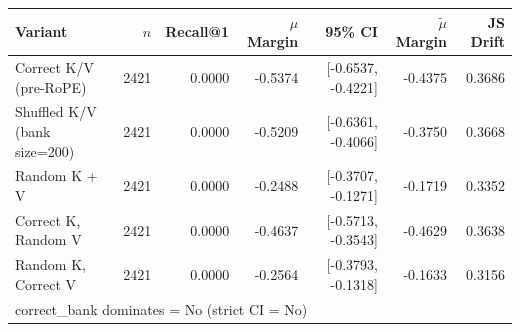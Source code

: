 \begin{tabular}{l r r r r r r}
\toprule
Variant & $n$ & Recall@1 & $\mu$ Margin & 95\% CI & $\tilde{\mu}$ Margin & JS Drift \\
\midrule
Correct K/V (pre-RoPE) & 2421 & 0.0000 & -0.5374 & [-0.6537, -0.4221] & -0.4375 & 0.3686 \\
Shuffled K/V (bank size=200) & 2421 & 0.0000 & -0.5209 & [-0.6361, -0.4066] & -0.3750 & 0.3668 \\
Random K + V & 2421 & 0.0000 & -0.2488 & [-0.3707, -0.1271] & -0.1719 & 0.3352 \\
Correct K, Random V & 2421 & 0.0000 & -0.4637 & [-0.5713, -0.3543] & -0.4629 & 0.3638 \\
Random K, Correct V & 2421 & 0.0000 & -0.2564 & [-0.3793, -0.1318] & -0.1633 & 0.3156 \\
\midrule
\multicolumn{7}{l}{correct\_bank dominates = No (strict CI = No)} \\
\bottomrule
\end{tabular}
